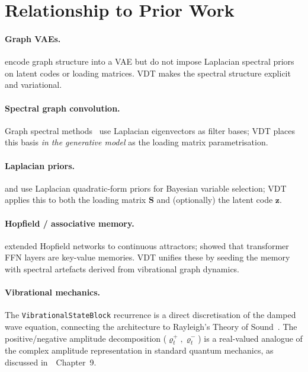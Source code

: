 \documentclass[11pt,a4paper]{article}
\newcommand{\bS}{\bm{S}}
\newcommand{\bz}{\bm{z}}
\begin{document}
{%
\section{Relationship to Prior Work}
\label{sec:related}

\paragraph{Graph VAEs.}  \citet{kipf2016vgae} encode graph structure
into a VAE but do not impose Laplacian spectral priors on latent codes or
loading matrices.  VDT makes the spectral structure explicit and
variational.

\paragraph{Spectral graph convolution.}  Graph spectral
methods~\citep{defferrard2016chebynet} use Laplacian eigenvectors as filter
bases; VDT places this basis \emph{in the generative model} as the loading
matrix parametrisation.

\paragraph{Laplacian priors.}  \citet{rao2008laplacian} and
\citet{slawski2015lapprior} use Laplacian quadratic-form priors for Bayesian
variable selection; VDT applies this to both the loading matrix $\bS$
and (optionally) the latent code $\bz$.

\paragraph{Hopfield / associative memory.}  \citet{ramsauer2020hopfield}
extended Hopfield networks to continuous attractors; \citet{geva2021ffn} showed
that transformer FFN layers are key-value memories.  VDT unifies these by
seeding the memory with spectral artefacts derived from vibrational graph
dynamics.

\paragraph{Vibrational mechanics.}  The \texttt{VibrationalStateBlock}
recurrence is a direct discretisation of the damped wave equation, connecting
the architecture to Rayleigh's Theory of Sound~\citep{rayleigh1877sound}.  The
positive/negative amplitude decomposition ($\varrho_t^+, \varrho_t^-$) is a
real-valued analogue of the complex amplitude representation in standard
quantum mechanics, as discussed in~\citet{aaronson2006democritus}~Chapter~9.

}
\end{document}
